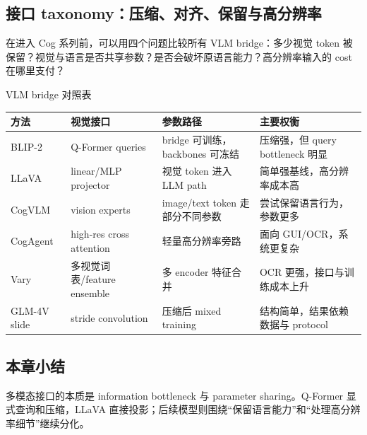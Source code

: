 \subsection{接口 taxonomy：压缩、对齐、保留与高分辨率}

在进入 Cog 系列前，可以用四个问题比较所有 VLM bridge：多少视觉 token 被保留？视觉与语言是否共享参数？是否会破坏原语言能力？高分辨率输入的 cost 在哪里支付？

\begin{knowledgebox}{VLM bridge 对照表}
\begin{tabularx}{\textwidth}{L{0.16\textwidth} L{0.22\textwidth} L{0.23\textwidth} X}
\toprule
方法 & 视觉接口 & 参数路径 & 主要权衡 \\
\midrule
BLIP-2 & Q-Former queries & bridge 可训练，backbones 可冻结 & 压缩强，但 query bottleneck 明显 \\
LLaVA & linear/MLP projector & 视觉 token 进入 LLM path & 简单强基线，高分辨率成本高 \\
CogVLM & vision experts & image/text token 走部分不同参数 & 尝试保留语言行为，参数更多 \\
CogAgent & high-res cross attention & 轻量高分辨率旁路 & 面向 GUI/OCR，系统更复杂 \\
Vary & 多视觉词表/feature ensemble & 多 encoder 特征合并 & OCR 更强，接口与训练成本上升 \\
GLM-4V slide & stride convolution & 压缩后 mixed training & 结构简单，结果依赖数据与 protocol \\
\bottomrule
\end{tabularx}
\end{knowledgebox}

\subsection{本章小结}

多模态接口的本质是 information bottleneck 与 parameter sharing。Q-Former 显式查询和压缩，LLaVA 直接投影；后续模型则围绕“保留语言能力”和“处理高分辨率细节”继续分化。

